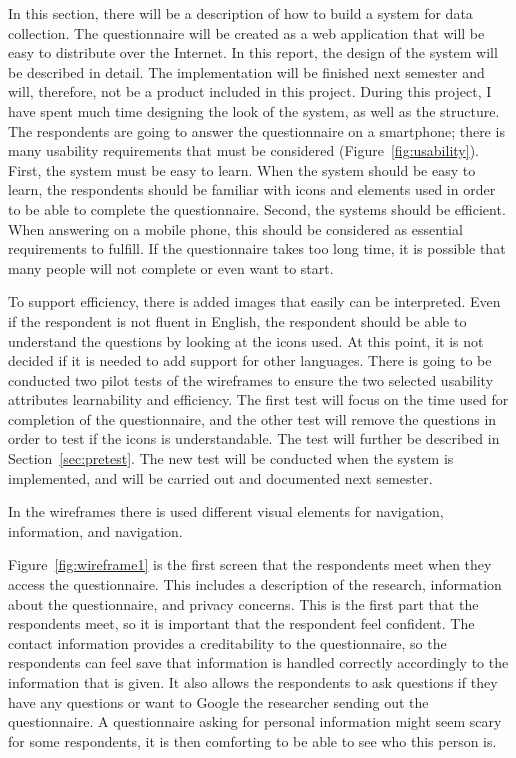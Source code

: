  In this section, there will be a description of how to build a system for data collection. The questionnaire will be created as a web application that will be easy to distribute over the Internet. In this report, the design of the system will be described in detail. The implementation will be finished next semester and will, therefore, not be a product included in this project. During this project, I have spent much time designing the look of the system, as well as the structure. The respondents are going to answer the questionnaire on a smartphone; there is many usability requirements that must be considered (Figure~\ref{fig:usability}). First, the system must be easy to learn. When the system should be easy to learn, the respondents should be familiar with icons and elements used in order to be able to complete the questionnaire. Second, the systems should be efficient. When answering on a mobile phone, this should be considered as essential requirements to fulfill. If the questionnaire takes too long time, it is possible that many people will not complete or even want to start.

  To support efficiency, there is added images that easily can be interpreted. Even if the respondent is not fluent in English, the respondent should be able to understand the questions by looking at the icons used. At this point, it is not decided if it is needed to add support for other languages. There is going to be conducted two pilot tests of the wireframes to ensure the two selected usability attributes learnability and efficiency. The first test will focus on the time used for completion of the questionnaire, and the other test will remove the questions in order to test if the icons is understandable. The test will further be described in Section~\ref{sec:pretest}. The new test will be conducted when the system is implemented, and will be carried out and documented next semester.


  In the wireframes there is used different visual elements for navigation, information, and navigation. 

  Figure~\ref{fig:wireframe1} is the first screen that the respondents meet when they access the questionnaire. This includes a description of the research, information about the questionnaire, and privacy concerns. This is the first part that the respondents meet, so it is important that the respondent feel confident. The contact information provides a creditability to the questionnaire, so the respondents can feel save that information is handled correctly accordingly to the information that is given. It also allows the respondents to ask questions if they have any questions or want to Google the researcher sending out the questionnaire. A questionnaire asking for personal information might seem scary for some respondents, it is then comforting to be able to see who this person is.

